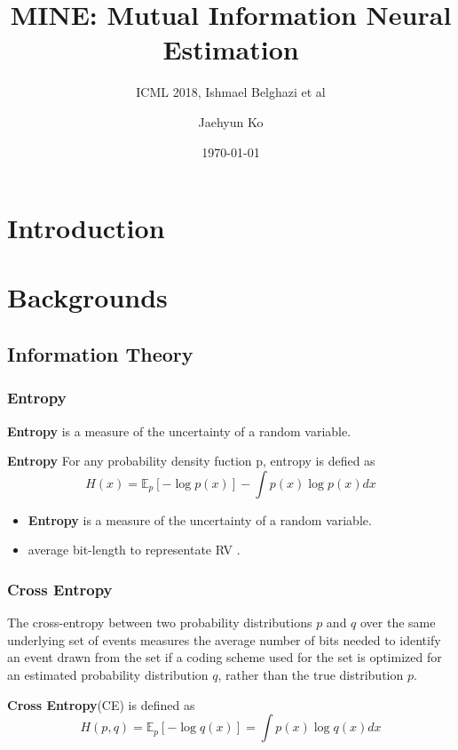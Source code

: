 \documentclass{beamer}
\begin{document}
\begin{frame}
	\title{MINE: Mutual Information Neural Estimation}
	\subtitle{ICML 2018, Ishmael Belghazi et al}
	\author{Jaehyun Ko}
	\date{\today}
	\titlepage
\end{frame}


\begin{frame}
\tableofcontents
\end{frame}



\section{Introduction}
\begin{frame}
	
\end{frame}

\section{Backgrounds}
\subsection{Information Theory}
\begin{frame}
	\frametitle{Entropy}
	\textbf{Entropy} is a measure of the uncertainty of a random variable.
	\begin{definition}
		\textbf{Entropy} For any probability density fuction p, entropy is defied as
		\begin{equation*}H(x) = \mathbb{E}_p [-\log p(x)] - \int {p(x)\log{p(x)}dx}\end{equation*}
	\end{definition}
	\begin{itemize}
		\item \textbf{Entropy} is a measure of the uncertainty of a random variable.
		\item average bit-length to representate RV \cite{shannon1948mathematical}.
	\end{itemize}
\end{frame}

\begin{frame}
	\frametitle{Cross Entropy}
	The cross-entropy between two probability distributions $p$ and $q$
	over the same underlying set of events measures
	the average number of bits needed to identify an event
	drawn from the set if a coding scheme used for the set
	is optimized for an estimated probability distribution $q$, rather than the true distribution $p$.
	\begin{definition}
		\textbf{Cross Entropy}(CE) is defined as 
		\begin{equation*}H(p, q) = \mathbb{E}_p [-\log q(x)] = \int p(x) \log q(x)dx\end{equation*}
	\end{definition}
	\end{frame}
\end{document}
